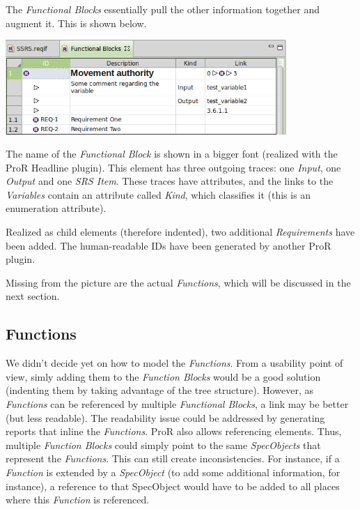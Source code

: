 \documentclass{template/openetcs_article}
\begin{document}
The \emph{Functional Blocks} essentially pull the other information together and augment it.  This is shown below.

\begin{center}
\includegraphics[width=0.8\textwidth]{img/functional-blocks.png}
\end{center}

The name of the \emph{Functional Block} is shown in a bigger font (realized with the ProR Headline plugin).  This element has three outgoing traces: one \emph{Input}, one \emph{Output} and one \emph{SRS Item}.  These traces have attributes, and the links to the \emph{Variables} contain an attribute called \emph{Kind}, which classifies it (this is an enumeration attribute).

Realized as child elements (therefore indented), two additional \emph{Requirements} have been added.  The human-readable IDs have been generated by another ProR plugin.

Missing from the picture are the actual \emph{Functions}, which will be discussed in the next section.

\subsection{Functions}

We didn't decide yet on how to model the \emph{Functions}.  From a usability point of view, simly adding them to the \emph{Function Blocks} would be a good solution (indenting them by taking advantage of the tree structure).  However, as \emph{Functions} can be referenced by multiple \emph{Functional Blocks}, a link may be better (but less readable).  The readability issue could be addressed by generating reports that inline the \emph{Functions}.  ProR also allows referencing elements.  Thus, multiple \emph{Function Blocks} could simply point to the same \emph{SpecObjects} that represent the \emph{Functions}.  This can still create inconsistencies.  For instance, if a \emph{Function} is extended by a \emph{SpecObject} (to add some additional information, for instance), a reference to that SpecObject would have to be added to all places where this \emph{Function} is referenced.
\end{document}
